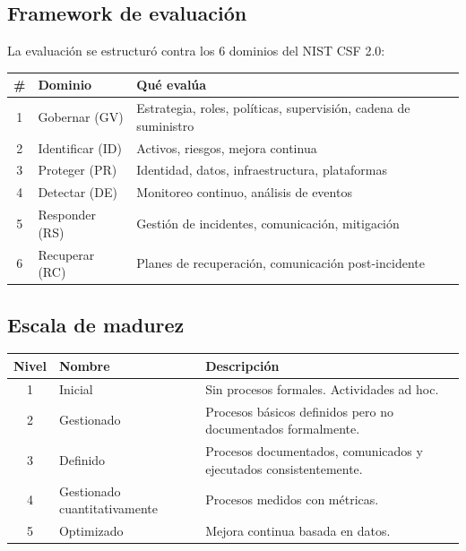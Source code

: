 \documentclass[11pt,a4paper]{article}
\begin{document}
	\subsection{Framework de evaluación}
	
	La evaluación se estructuró contra los 6 dominios del NIST CSF 2.0:
	
	\begin{table}[H]
		\centering
		\begin{tabular}{@{}clp{10.5cm}@{}}
			\toprule
			\textbf{\#} & \textbf{Dominio} & \textbf{Qué evalúa} \\ \midrule
			1 & Gobernar (GV) & Estrategia, roles, políticas, supervisión, cadena de suministro \\
			2 & Identificar (ID) & Activos, riesgos, mejora continua \\
			3 & Proteger (PR) & Identidad, datos, infraestructura, plataformas \\
			4 & Detectar (DE) & Monitoreo continuo, análisis de eventos \\
			5 & Responder (RS) & Gestión de incidentes, comunicación, mitigación \\
			6 & Recuperar (RC) & Planes de recuperación, comunicación post-incidente \\ \bottomrule
		\end{tabular}
	\end{table}
	
	\subsection{Escala de madurez}
	
	\begin{table}[H]
		\centering
		\begin{tabular}{@{}clp{8cm}@{}}
			\toprule
			\textbf{Nivel} & \textbf{Nombre} & \textbf{Descripción} \\ \midrule
			1 & Inicial & Sin procesos formales. Actividades ad hoc. \\
			2 & Gestionado & Procesos básicos definidos pero no documentados formalmente. \\
			3 & Definido & Procesos documentados, comunicados y ejecutados consistentemente. \\
			4 & Gestionado cuantitativamente & Procesos medidos con métricas. \\
			5 & Optimizado & Mejora continua basada en datos. \\ \bottomrule
		\end{tabular}
	\end{table}
	
\end{document}
